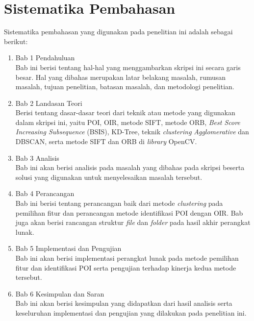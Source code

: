 \section{Sistematika Pembahasan}
\label{sec:sispem}
Sistematika pembahasan yang digunakan pada penelitian ini adalah sebagai berikut:
\begin{enumerate}
	\item Bab 1 Pendahuluan \\
	Bab ini berisi tentang hal-hal yang menggambarkan skripsi ini secara garis besar. Hal yang dibahas merupakan latar belakang masalah, rumusan masalah, tujuan penelitian, batasan masalah, dan metodologi penelitian.
	\item Bab 2 Landasan Teori \\
	Berisi tentang dasar-dasar teori dari teknik atau metode yang digunakan dalam skripsi ini, yaitu POI, OIR, metode SIFT, metode ORB, \textit{Best Score Increasing Subsequence} (BSIS), KD-Tree, teknik \textit{clustering} \textit{Agglomerative} dan DBSCAN, serta metode SIFT dan ORB di \textit{library} OpenCV.
	\item Bab 3 Analisis \\
	Bab ini akan berisi analisis pada masalah yang dibahas pada skripsi beserta solusi yang digunakan untuk menyelesaikan masalah tersebut.
	\item Bab 4 Perancangan \\
	Bab ini berisi tentang perancangan baik dari metode \textit{clustering} pada pemilihan fitur dan perancangan metode identifikasi POI dengan OIR. Bab juga akan berisi rancangan struktur \textit{file} dan \textit{folder} pada hasil akhir perangkat lunak.
	\item Bab 5 Implementasi dan Pengujian \\
	Bab ini akan berisi implementasi perangkat lunak pada metode pemilihan fitur dan identifikasi POI serta pengujian terhadap kinerja kedua metode tersebut.
	\item Bab 6 Kesimpulan dan Saran \\
	Bab ini akan berisi kesimpulan yang didapatkan dari hasil analisis serta keseluruhan implementasi dan pengujian yang dilakukan pada penelitian ini.
\end{enumerate}